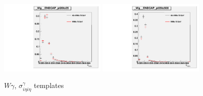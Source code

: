 \begin{figure}[htb]
\begin{center}
  \includegraphics[width=0.45\textwidth]{../figs/figs_v11/ChannelsMERGED_WGamma/QuickChecks/cTemplatesVsWMt_Wg_phoSigmaIEtaIEta_ENDCAP_pt20to35.pdf} \includegraphics[width=0.45\textwidth]{../figs/figs_v11/ChannelsMERGED_WGamma/QuickChecks/cTemplatesVsWMt_Wg_phoSigmaIEtaIEta_ENDCAP_pt35to500.pdf}\\
  \caption{$W\gamma$, $\sigma_{i \eta i \eta}^\gamma$ templates}
  \label{fig:templatesVsWMt_Wg_SIHIH}
  \end{center}
\end{figure}

